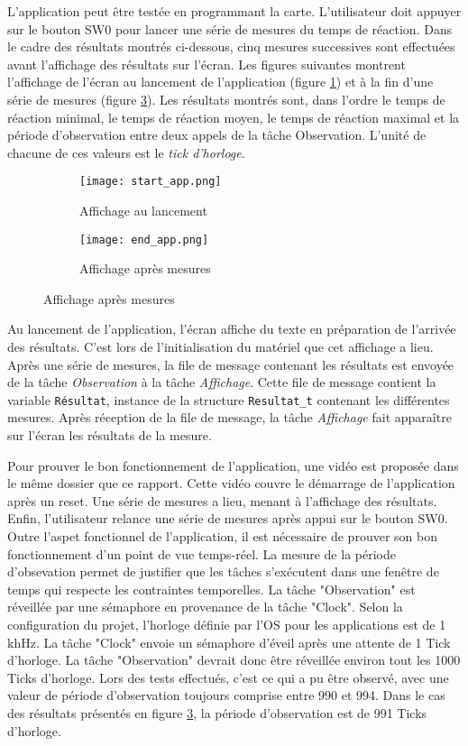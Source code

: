 L'application peut être testée en programmant la carte.
L'utilisateur doit appuyer sur le bouton SW0 pour lancer une série de mesures du temps de réaction.
Dans le cadre des résultats montrés ci-dessous, cinq mesures successives sont effectuées avant l'affichage des résultats sur l'écran.
Les figures suivantes montrent l'affichage de l'écran au lancement de l'application (figure \ref{fig:start_app}) et à la fin d'une série de mesures (figure \ref{fig:end_app}).
Les résultats montrés sont, dans l'ordre le temps de réaction minimal, le temps de réaction moyen, le temps de réaction maximal et la période d'observation entre deux appels de la tâche Observation.
L'unité de chacune de ces valeurs est le \textit{tick d'horloge}.
\begin{figure}[H]
    \centering
    \begin{subfigure}[b]{0.3\textwidth}
        \texttt{[image: start\_app.png]}
        \caption{Affichage au lancement}
        \label{fig:start_app}
    \end{subfigure}
    \begin{subfigure}[b]{0.50\textwidth}
        \texttt{[image: end\_app.png]}
        \caption{Affichage après mesures}
        \label{fig:end_app}
    \end{subfigure}
\end{figure}
Au lancement de l'application, l'écran affiche du texte en préparation de l'arrivée des résultats.
C'est lors de l'initialisation du matériel que cet affichage a lieu.
Après une série de mesures, la file de message contenant les résultats est envoyée de la tâche \textit{Observation} à la tâche \textit{Affichage}.
Cette file de message contient la variable \texttt{Résultat}, instance de la structure \texttt{Resultat\_t} contenant les différentes mesures.
Après réception de la file de message, la tâche \textit{Affichage} fait apparaître sur l'écran les résultats de la mesure.

Pour prouver le bon fonctionnement de l'application, une vidéo est proposée dans le même dossier que ce rapport.
Cette vidéo couvre le démarrage de l'application après un reset. 
Une série de mesures a lieu, menant à l'affichage des résultats.
Enfin, l'utilisateur relance une série de mesures après appui sur le bouton SW0.
Outre l'aspet fonctionnel de l'application, il est nécessaire de prouver son bon fonctionnement d'un point de vue temps-réel.
La mesure de la période d'obsevation permet de justifier que les tâches s'exécutent dans une fenêtre de temps qui respecte les contraintes temporelles.
La tâche "Observation" est réveillée par une sémaphore en provenance de la tâche "Clock".
Selon la configuration du projet, l'horloge définie par l'OS pour les applications est de 1 khHz.
La tâche "Clock" envoie un sémaphore d'éveil après une attente de 1 Tick d'horloge.
La tâche "Observation" devrait donc être réveillée environ tout les 1000 Ticks d'horloge.
Lors des tests effectués, c'est ce qui a pu être observé, avec une valeur de période d'observation toujours comprise entre 990 et 994.
Dans le cas des résultats présentés en figure \ref{fig:end_app}, la période d'observation est de 991 Ticks d'horloge.